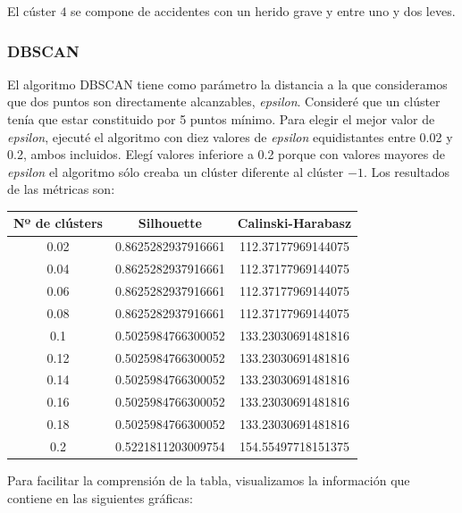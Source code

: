 \documentclass[a4]{article}
\begin{document}
El cúster $4$ se compone de accidentes con un herido grave y entre uno y dos leves.

\subsubsection{DBSCAN}

El algoritmo DBSCAN tiene como parámetro la distancia a la que consideramos que dos puntos son directamente alcanzables, \textit{epsilon}. Consideré que un clúster tenía que estar constituido por 5 puntos mínimo. Para elegir el mejor valor de \textit{epsilon}, ejecuté el algoritmo con diez valores de \textit{epsilon} equidistantes entre 0.02 y 0.2, ambos incluidos. Elegí valores inferiore a 0.2 porque con valores mayores de \textit{epsilon} el algoritmo sólo creaba un clúster diferente al clúster $-1$.  Los resultados de las métricas son:

\begin{center}
\begin{tabular}{|c|c|c|}
\hline
\multicolumn{1}{|c|}{\textbf{Nº de clústers}}& \textbf{Silhouette} & \textbf{Calinski-Harabasz}\\ \hline
  0.02  & 0.8625282937916661  & 112.37177969144075  \\ \hline
  0.04  & 0.8625282937916661  & 112.37177969144075  \\ \hline
  0.06  & 0.8625282937916661  & 112.37177969144075  \\ \hline
  0.08  & 0.8625282937916661  & 112.37177969144075  \\ \hline
  0.1   & 0.5025984766300052  & 133.23030691481816  \\ \hline
  0.12  & 0.5025984766300052  & 133.23030691481816  \\ \hline
  0.14  & 0.5025984766300052  & 133.23030691481816  \\ \hline
  0.16  & 0.5025984766300052  & 133.23030691481816  \\ \hline
  0.18  & 0.5025984766300052  & 133.23030691481816  \\ \hline
  0.2   & 0.5221811203009754  & 154.55497718151375  \\ \hline
\end{tabular}
\end{center}

Para facilitar la comprensión de la tabla, visualizamos la información que contiene en las siguientes gráficas:
\end{document}
